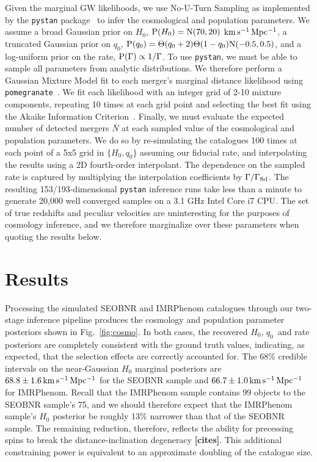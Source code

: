 \documentclass[%
 reprint,
 superscriptaddress,
 nofootinbib,
 amsmath,amssymb,
 aps,
]{revtex4-2}
\newcommand{\hubble}{\ensuremath{H_0}}
\newcommand{\decel}{\ensuremath{q_0}}
\newcommand{\prob}{\ensuremath{{\rm P}}}
\newcommand{\normal}{{\rm{N}}}
\newcommand{\nexp}{\bar{N}}
\newcommand{\rate}{\Gamma}
\newcommand{\step}{\Theta}
\newcommand{\kmsmpc}{\ensuremath{{\rm km\,s^{-1}\,Mpc^{-1}}}}
\begin{document}
Given the marginal GW likelihoods, we use No-U-Turn Sampling as implemented by the \texttt{pystan} package~\citep{pystan} to infer the cosmological and population parameters. We assume a broad Gaussian prior on \hubble, $\prob(\hubble)=\normal(70,20)$ \kmsmpc, a truncated Gaussian prior on \decel, $\prob(\decel)=\step(\decel+2)\step(1-\decel)\normal(-0.5,0.5)$, and a log-uniform prior on the rate, $\prob(\rate) \propto 1/\rate$. To use \texttt{pystan}, we must be able to sample all parameters from analytic distributions. We therefore perform a Gaussian Mixture Model fit to each merger's marginal distance likelihood using \texttt{pomegranate}~\citep{Schreiber:2017}. We fit each likelihood with an integer grid of 2-10 mixture components, repeating 10 times at each grid point and selecting the best fit using the Akaike Information Criterion~\citep{Akaike:1974}. Finally, we must evaluate the expected number of detected mergers $\nexp$ at each sampled value of the cosmological and population parameters. We do so by re-simulating the catalogues 100 times at each point of a 5x5 grid in $\{H_0,q_0\}$ assuming our fiducial rate, and interpolating the results using a 2D fourth-order interpolant. The dependence on the sampled rate is captured by multiplying the interpolation coefficients by $\Gamma/\Gamma_{\rm fid}$. The resulting 153/193-dimensional \texttt{pystan} inference runs take less than a minute to generate 20,000 well converged samples on a 3.1 GHz Intel Core i7 CPU. The set of true redshifts and peculiar velocities are uninteresting for the purposes of cosmology inference, and we therefore marginalize over these parameters when quoting the results below.


\section{Results} \label{sec:results}

Processing the simulated SEOBNR and IMRPhenom catalogues through our two-stage inference pipeline produces the cosmology and population parameter posteriors shown in Fig.~\ref{fig:cosmo}. In both cases, the recovered \hubble, \decel\ and rate posteriors are completely consistent with the ground truth values, indicating, as expected, that the selection effects are correctly accounted for. The 68\% credible intervals on the near-Gaussian $\hubble$ marginal posteriors are $68.8 \pm 1.6\,\kmsmpc$ for the SEOBNR sample and $66.7 \pm 1.0\,\kmsmpc$ for IMRPhenom. Recall that the IMRPhenom sample contains 99 objects to the SEOBNR sample's 75, and we should therefore expect that the IMRPhenom sample's $\hubble$ posterior be roughly 13\% narrower than that of the SEOBNR sample. The remaining reduction, therefore, reflects the ability for precessing spins to break the distance-inclination degeneracy {\bf [cites]}. This additional constraining power is equivalent to an approximate doubling of the catalogue size.
\end{document}
